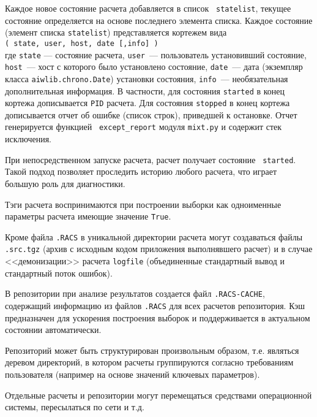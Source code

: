 Каждое новое состояние расчета добавляется в список {\tt
  statelist}, текущее состояние определяется на основе последнего элемента
списка. 
Каждое состояние (элемент списка {\tt statelist}) представляется кортежем вида\\[2mm]
\verb'( state, user, host, date [,info] )'\\[2mm]
где {\tt state} --- состояние расчета, {\tt user}~--- пользователь
установивший состояние, {\tt host}~--- хост с которого было установлено
состояние, {\tt date}~--- дата (экземпляр класса \verb'aiwlib.chrono.Date') 
установки состояния, {\tt info}~--- необязательная дополнительная
информация.
В частности, для состояния {\tt started} в конец кортежа дописывается {\tt PID}
расчета. Для состояния {\tt stopped} в конец кортежа дописывается отчет об
ошибке (список строк), приведшей к остановке. Отчет генерируется функцией {\tt
except\_report} модуля {\tt mixt.py} и содержит стек исключения.

При непосредственном запуске расчета, расчет получает состояние {\tt
  started}.
Такой подход позволяет проследить историю любого расчета, что играет
большую роль для диагностики.

Тэги расчета воспринимаются при построении выборки как одноименные параметры расчета имеющие значение \verb'True'. 

Кроме файла \verb'.RACS' в уникальной директории расчета могут создаваться файлы \verb'.src.tgz' (архив с исходным кодом приложения выполнявшего расчет)
и в случае <<демонизации>> расчета \verb'logfile' (объединенные стандартный вывод и стандартный поток ошибок).

В репозитории при анализе результатов создается файл \verb'.RACS-CACHE',
содержащий информацию из файлов \verb'.RACS' для всех расчетов репозитория. Кэш предназначен
для ускорения построения выборок и поддерживается в актуальном состоянии автоматически.

Репозиторий может быть структурирован произвольным образом, т.е. являться деревом директорий,
в котором расчеты группируются согласно требованиям пользователя (например на основе значений ключевых параметров).

Отдельные расчеты и репозитории могут перемещаться средствами операционной системы, пересылаться по сети и т.д.
